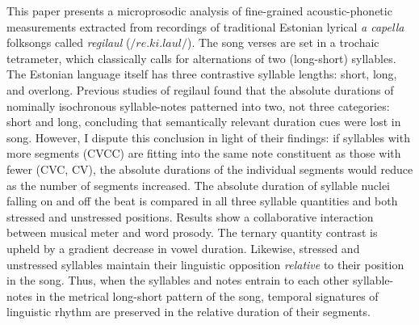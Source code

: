 \documentclass[12pt]{report}	%
\theoremstyle{plain} %
\theoremstyle{definition}
\theoremstyle{remark}
\numberwithin{equation}{section}
\begin{document}
This paper presents a microprosodic analysis of fine-grained acoustic-phonetic measurements extracted from recordings of traditional Estonian lyrical {\it a capella} folksongs called {\it regilaul} (\(/re.ki.laul/\)). The song verses are set in a trochaic tetrameter, which classically calls for alternations of two (long-short) syllables. The Estonian language itself has three contrastive syllable lengths: short, long, and overlong. Previous studies of regilaul found that the absolute durations of nominally isochronous syllable-notes patterned into two, not three categories: short and long, concluding that semantically relevant duration cues were lost in song. However, I dispute this conclusion in light of their findings: if syllables with more segments (CVCC) are fitting into the same note constituent as those with fewer (CVC, CV), the absolute durations of the individual segments would reduce as the number of segments increased.  The absolute duration of syllable nuclei falling on and off the beat is compared in all three syllable quantities and both stressed and unstressed positions. Results show a collaborative interaction between musical meter and word prosody. The ternary quantity contrast is upheld by a gradient decrease in vowel duration. Likewise, stressed and unstressed syllables maintain their linguistic opposition {\it relative} to their position in the song. Thus, when the syllables and notes entrain to each other syllable-notes in the  metrical long-short pattern of the song, temporal signatures of linguistic rhythm are preserved in the relative duration of their segments.




 
 
  \tableofcontents   %

\listoftables      %
\listoffigures     %



%


%




%


%
\appendices
{}%
\end{document}
